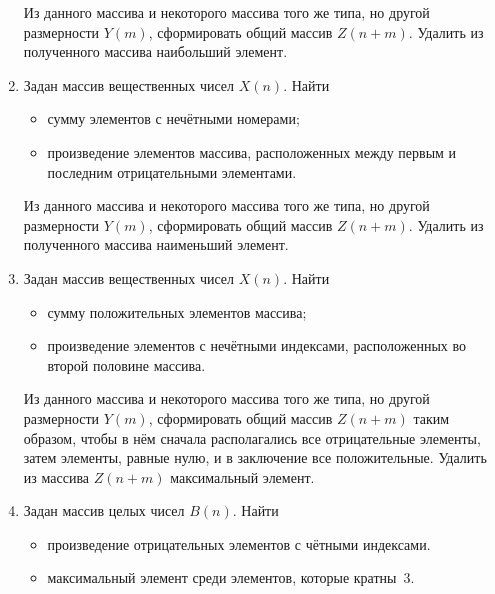 \begin{enumerate}
Из данного массива и некоторого массива того же типа, но другой размерности $Y(m)$,
сформировать общий массив $Z(n+m)$. Удалить из полученного массива наибольший
элемент.
\item Задан массив вещественных чисел $X(n)$. Найти
\begin{itemize}
\item сумму элементов с нечётными номерами;
\item произведение элементов массива, расположенных между первым и последним отрицательными элементами.
\end{itemize}
Из данного массива и некоторого массива того же типа, но другой размерности $Y(m)$,
сформировать общий массив $Z(n+m)$. Удалить из полученного массива наименьший
элемент.
\item Задан массив вещественных чисел $X(n)$. Найти
\begin{itemize}
\item сумму положительных элементов массива;
\item произведение элементов с нечётными индексами, расположенных во второй половине массива. 
\end{itemize}
Из данного массива и некоторого массива того же типа, но другой размерности $Y(m)$,
сформировать общий массив $Z(n+m)$ таким образом, чтобы в нём сначала располагались
все отрицательные элементы, затем элементы, равные нулю, и в заключение все положительные. Удалить из массива
$Z(n+m)$ максимальный элемент.
\item Задан массив целых чисел $B(n)$. Найти
\begin{itemize}
\item произведение отрицательных элементов с чётными индексами.
\item максимальный элемент среди элементов, которые кратны~3.
\end{itemize}


\end{enumerate}
